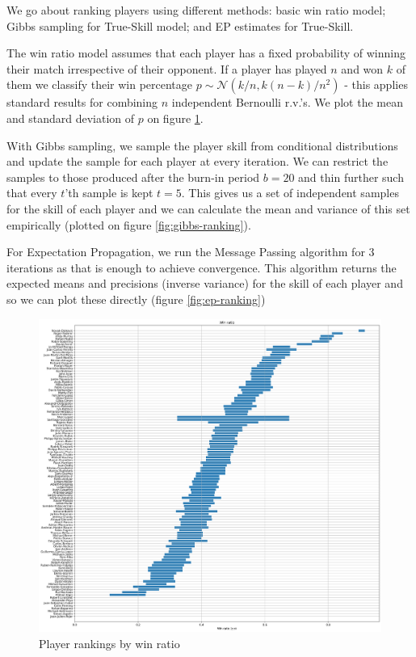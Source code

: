 \documentclass[]{article}
\newcommand{\Ncal}{\mathcal{N}}
\begin{document}
We go about ranking players using different methods: basic win ratio model; Gibbs sampling for True-Skill model; and EP estimates for True-Skill.

The win ratio model assumes that each player has a fixed probability of winning their match irrespective of their opponent. If a player has played $n$ and won $k$ of them we classify their win percentage $p \sim \Ncal(k/n, k(n-k)/n^2)$ - this applies standard results for combining $n$ independent Bernoulli r.v.'s. We plot the mean and standard deviation of $p$ on figure \ref{fig:win-ratio-ranking}.

With Gibbs sampling, we sample the player skill from conditional distributions and update the sample for each player at every iteration. We can restrict the samples to those produced after the burn-in period $b=20$ and thin further such that every $t$'th sample is kept $t=5$. This gives us a set of independent samples for the skill of each player and we can calculate the mean and variance of this set empirically (plotted on figure \ref{fig:gibbs-ranking}).

For Expectation Propagation, we run the Message Passing algorithm for 3 iterations as that is enough to achieve convergence. This algorithm returns the expected means and precisions (inverse variance) for the skill of each player and so we can plot these directly (figure \ref{fig:ep-ranking})

\begin{figure}[!h]
	\centering
	\includegraphics[width=\linewidth]{win-ratio.png}
	\caption{Player rankings by win ratio}
	\label{fig:win-ratio-ranking}
\end{figure}
\end{document}

